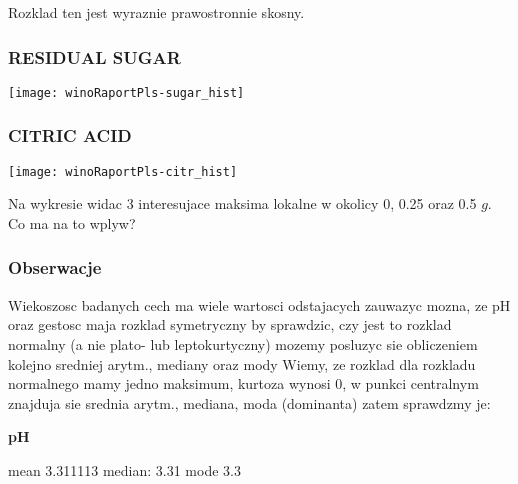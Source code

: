 \documentclass{article}
\begin{document}
Rozklad ten jest wyraznie prawostronnie skosny.


\subsubsection{RESIDUAL SUGAR}

\begin{Schunk}
\end{Schunk}
\texttt{[image: winoRaportPls-sugar\_hist]}


\subsubsection{CITRIC ACID}

\begin{Schunk}
\end{Schunk}
\texttt{[image: winoRaportPls-citr\_hist]}

Na wykresie widac 3 interesujace maksima lokalne w okolicy 0, 0.25 oraz 0.5 $g$. 
Co ma na to wplyw?



\subsubsection{Obserwacje}

Wiekoszosc badanych cech ma wiele wartosci odstajacych
zauwazyc mozna, ze pH oraz gestosc maja rozklad symetryczny
by sprawdzic, czy jest to rozklad normalny (a nie plato- lub leptokurtyczny)
mozemy posluzyc sie obliczeniem kolejno sredniej arytm., mediany oraz mody  
\newline
Wiemy, ze rozklad dla rozkladu normalnego mamy jedno maksimum, kurtoza wynosi 0,
w punkci centralnym znajduja sie srednia arytm., mediana, moda (dominanta)
zatem sprawdzmy je:


{\bf{pH}}
\begin{Schunk}
\begin{Soutput}
mean    3.311113 
median: 3.31 
mode    3.3
\end{Soutput}
\end{Schunk}
\end{document}
